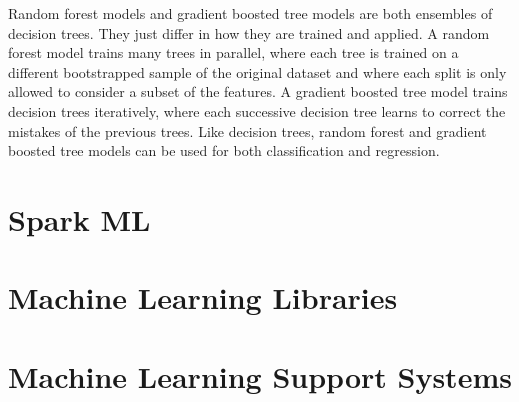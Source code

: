 Random forest models and gradient boosted tree models are both ensembles of decision trees. They just differ in how they
are trained and applied. A random forest model trains many trees in parallel, where each tree is trained on a different bootstrapped
sample of the original dataset and where each split is only allowed to consider a subset of the features. A gradient boosted tree model
trains decision trees iteratively, where each successive decision tree learns to correct the mistakes of the previous trees. Like decision
trees, random forest and gradient boosted tree models can be used for both classification and regression. \cite{introtostatlearn}

\section{Spark ML}

\section{Machine Learning Libraries}

\section{Machine Learning Support Systems}

